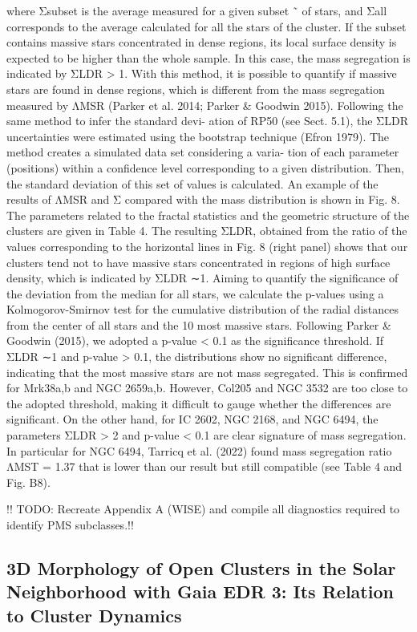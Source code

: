 \documentclass[../main.tex]{subfiles}
\begin{document}
{where
Σsubset is the average measured for a given subset
˜
of stars, and
Σall corresponds to the average calculated for
all the stars of the cluster. If the subset contains massive
stars concentrated in dense regions, its local surface density
is expected to be higher than the whole sample. In this case,
the mass segregation is indicated by ΣLDR > 1. With this
method, it is possible to quantify if massive stars are found
in dense regions, which is different from the mass segregation
measured by ΛMSR (Parker et al. 2014; Parker & Goodwin
2015).
Following the same method to infer the standard devi-
ation of RP50 (see Sect. 5.1), the ΣLDR uncertainties were
estimated using the bootstrap technique (Efron 1979). The
method creates a simulated data set considering a varia-
tion of each parameter (positions) within a confidence level
corresponding to a given distribution. Then, the standard
deviation of this set of values is calculated.
An example of the results of ΛMSR and Σ compared with
the mass distribution is shown in Fig. 8. The parameters
related to the fractal statistics and the geometric structure
of the clusters are given in Table 4. The resulting ΣLDR,
obtained from the ratio of the values corresponding to the
horizontal lines in Fig. 8 (right panel) shows that our clusters
tend not to have massive stars concentrated in regions of
high surface density, which is indicated by ΣLDR ∼1.
Aiming to quantify the significance of the deviation
from the median for all stars, we calculate the p-values using
a Kolmogorov-Smirnov test for the cumulative distribution
of the radial distances from the center of all stars and the
10 most massive stars. Following Parker & Goodwin (2015),
we adopted a p-value < 0.1 as the significance threshold.
If ΣLDR ∼1 and p-value > 0.1, the distributions show no
significant difference, indicating that the most massive stars
are not mass segregated. This is confirmed for Mrk38a,b
and NGC 2659a,b. However, Col205 and NGC 3532 are too
close to the adopted threshold, making it difficult to gauge
whether the differences are significant. On the other hand,
for IC 2602, NGC 2168, and NGC 6494, the parameters
ΣLDR > 2 and p-value < 0.1 are clear signature of mass
segregation.
In particular for NGC 6494, Tarricq et al. (2022) found
mass segregation ratio ΛMST = 1.37 that is lower than our
result but still compatible (see Table 4 and Fig. B8).

!! TODO: Recreate Appendix A (WISE) and compile all diagnostics required to identify PMS subclasses.!!

\subsection{3D Morphology of Open Clusters in the Solar Neighborhood with Gaia EDR 3: Its
	Relation to Cluster Dynamics}

}
\end{document}
